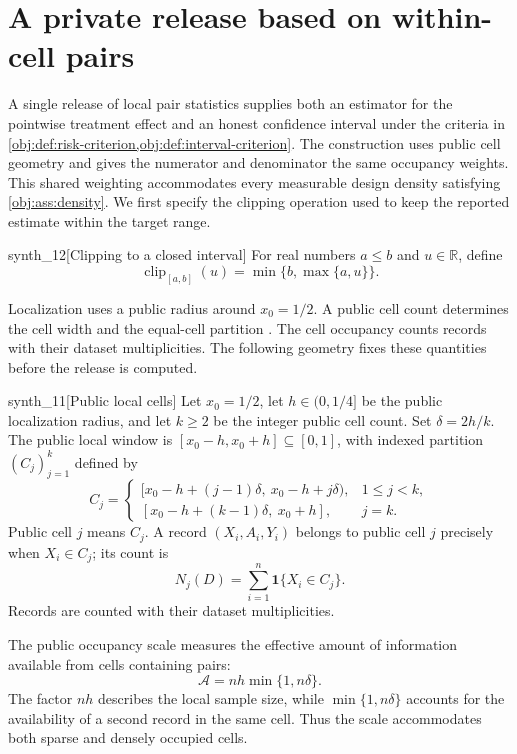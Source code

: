 \section{A private release based on within-cell pairs}

A single release of local pair statistics supplies both an estimator for the pointwise treatment effect and an honest confidence interval under the criteria in \cref{obj:def:risk-criterion,obj:def:interval-criterion}. The construction uses public cell geometry and gives the numerator and denominator the same occupancy weights. This shared weighting accommodates every measurable design density satisfying \cref{obj:ass:density}. We first specify the clipping operation used to keep the reported estimate within the target range.
\begin{definitionv}{synth_12}[Clipping to a closed interval]
For real numbers \(a\le b\) and \(u\in\mathbb R\), define
\[
\operatorname{clip}_{[a,b]}(u)=\min\{b,\max\{a,u\}\}.
\]
\end{definitionv}

Localization uses a public radius  around \(x_0=1/2\). A public cell count  determines the cell width  and the equal-cell partition . The cell occupancy  counts records with their dataset multiplicities. The following geometry fixes these quantities before the release is computed.
\begin{definitionv}{synth_11}[Public local cells]
Let \(x_0=1/2\), let \(h\in(0,1/4]\) be the public localization radius, and let \(k\ge2\) be the integer public cell count. Set \(\delta=2h/k\). The public local window is \([x_0-h,x_0+h]\subseteq[0,1]\), with indexed partition \((C_j)_{j=1}^k\) defined by
\[
C_j=
\begin{cases}
[x_0-h+(j-1)\delta,\ x_0-h+j\delta),&1\le j<k,\\
[x_0-h+(k-1)\delta,\ x_0+h],&j=k.
\end{cases}
\]
Public cell \(j\) means \(C_j\). A record \((X_i,A_i,Y_i)\) belongs to public cell \(j\) precisely when \(X_i\in C_j\); its count is
\[
N_j(D)=\sum_{i=1}^n\mathbf1\{X_i\in C_j\}.
\]
Records are counted with their dataset multiplicities.
\end{definitionv}

The public occupancy scale  measures the effective amount of information available from cells containing pairs:
\[
\mathcal A=nh\min\{1,n\delta\}.
\]
The factor \(nh\) describes the local sample size, while \(\min\{1,n\delta\}\) accounts for the availability of a second record in the same cell. Thus the scale accommodates both sparse and densely occupied cells.

